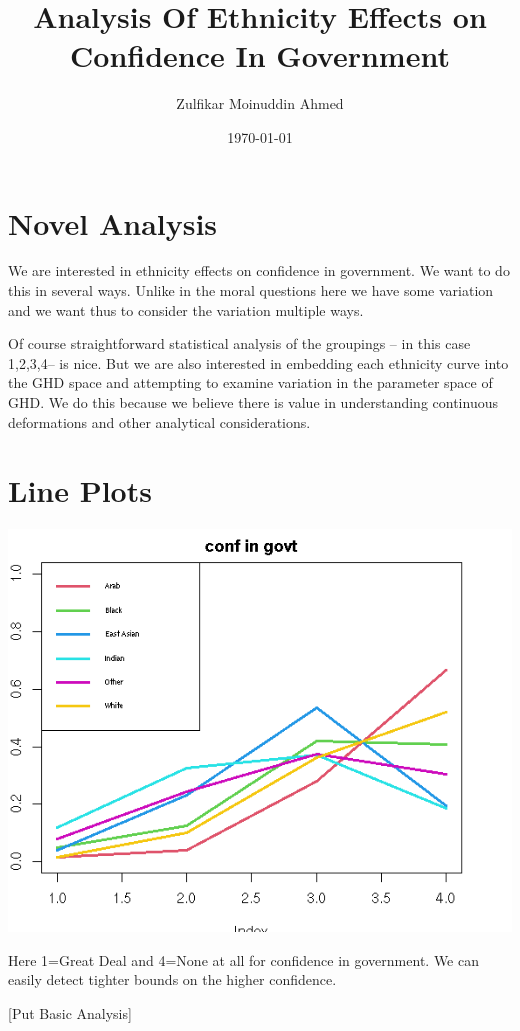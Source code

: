 \documentclass{amsart}
\title{Analysis Of Ethnicity Effects on Confidence In Government}
\author{Zulfikar Moinuddin Ahmed}
\date{\today}
\begin{document}
\maketitle

\section{Novel Analysis}

We are interested in ethnicity effects on confidence in government.  We want to do this in several ways.  Unlike in the moral questions here we have some variation and we want thus to consider the variation multiple ways.

Of course straightforward statistical analysis of the groupings -- in this case 1,2,3,4-- is nice.  But we are also interested in embedding each ethnicity curve into the GHD space and attempting to examine variation in the parameter space of GHD.  We do this because we believe there is value in understanding continuous deformations and other analytical considerations.

\section{Line Plots}

\includegraphics[scale=0.8]{confgovt.png}

Here 1=Great Deal and 4=None at all for confidence in government.  We can easily detect tighter bounds on the higher confidence.

[Put Basic Analysis]
\end{document}
